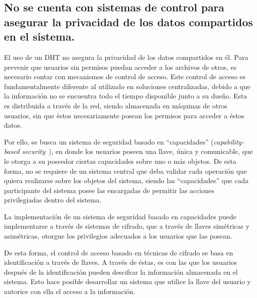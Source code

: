     

  \subsection{No se cuenta con sistemas de control para asegurar la privacidad de los datos compartidos en el sistema.}

    El uso de un DHT no asegura la privacidad de los datos
    compartidos en él. Para prevenir que usuarios sin permisos puedan acceder a los
    archivos de otros, es necesario contar con mecanismos de control de acceso.
    Este control de acceso es fundamentalmente diferente al utilizado en soluciones
    centralizadas, debido a que la información no se encuentra todo el tiempo
    disponible junto a su dueño. Esta es distribuida a través de la red,
    siendo almacenada en máquinas de otros usuarios, sin que éstos necesariamente
    posean los permisos para acceder a éstos datos.
    
    Por ello, se busca un sistema de seguridad basado en ``capacidades'' (\textit{capability-based
    security}~\cite{levy1984capability-based}), en donde los usuarios poseen una llave, única y comunicable, que le otorga
    a su poseedor ciertas capacidades sobre uno o más objetos. De esta forma,
    no se requiere de un sistema central que deba validar cada operación que
    quiera realizarse sobre los objetos del sistema, siendo las ``capacidades''
    que cada participante del sistema posee las encargadas de permitir las acciones
    privilegiadas dentro del sistema.

     La implementación de un sistema de seguridad basado en capacidades puede
    implementarse a través de sistemas de cifrado, que a través de llaves
    simétricas y asimétricas, otorgue los privilegios adecuados a los usuarios que
    las posean.

    De esta forma, el control de acceso basado en
    técnicas de cifrado se basa en identificación a través de llaves. A través de éstas, es
    con las que los usuarios  después de la identificación pueden
    descifrar la información almacenada en el sistema. Esto hace posible
    desarrollar un sistema que utilice la
    llave del usuario y autorice con ella el acceso a la información.

